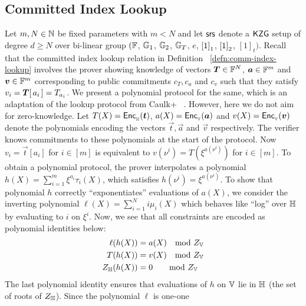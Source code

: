 \subsection{Committed Index Lookup}\label{subsec:committed-index-lookup}
Let $m,N\in \mathbb{N}$ be fixed parameters with $m < N$ and let $\mathsf{srs}$ denote a $\mathsf{KZG}$ setup of degree $d\geq N$
over bi-linear group $(\mathbb{F}$, $\mathbb{G}_1$, $\mathbb{G}_2$, $\mathbb{G}_T$, $e$, $\left[{1}\right]_1$, $\left[{1}\right]_2$, $[1]_t)$. Recall that the committed index
lookup relation in Definition ~\ref{defn:comm-index-lookup} involves the prover showing knowledge of vectors $\vecT\in \F^N$,
$\vec{a}\in \F^m$ and $\vec{v}\in \F^m$ corresponding to public commitments $c_T, c_a$ and $c_v$ such that they
satisfy $v_i = \vecT[\,a_i\,] = T_{a_i}$.
We present a polynomial protocol for the same, which is an adaptation of the lookup protocol from Caulk+ ~\cite{EPRINT:PosKat22}.
However, here we do not aim for zero-knowledge. Let $T(X)=\enc{t}{\setN}$, $a(X)=\enc{a}{\setV}$ and
$v(X)=\enc{v}{\setV}$ denote the polynomials encoding the vectors $\vec{t},\vec{a}$ and $\vec{v}$ respectively.
The verifier knows commitments to these polynomials at the start of the protocol.
Now $v_i = \vec{t}[a_i]$ for $i\in [m]$ is equivalent to $v(\nu^i) = T(\xi^{a(\nu^i)})$ for $i\in [m]$. To
obtain a polynomial protocol, the prover interpolates a polynomial $h(X)=\sum_{i=1}^m \xi^{a_i}\tau_i(X)$, which satisfies
$h(\nu^i)=\xi^{a(\nu^i)}$. To show that polynomial $h$ correctly ``exponentiates'' evaluations of $a(X)$, we consider the
inverting polynomial $\ell(X)=\sum_{i=1}^N i\mu_i(X)$ which behaves like ``log'' over $\mathbb{H}$ by evaluating to $i$ on $\xi^i$. Now, we see
that all constraints are encoded as polynomial identities below:
\begin{equation}
    \begin{aligned}
        \ell(h(X)) &= a(X) \quad \text{mod } Z_{\setV}\\  %
        T(h(X)) &= v(X) \quad \text{mod } Z_\setV \\ %
        Z_{\setN}(h(X)) &= 0 \qquad \text{mod } Z_\setV  %
    \end{aligned}
    \label{eq:comm-index-lookup}
\end{equation}
The last polynomial identity ensures that evaluations of $h$ on $\mathbb{V}$ lie in $\mathbb{H}$ (the set of roots of $Z_\mathbb{H}$). Since the polynomial $\ell$ is one-one

